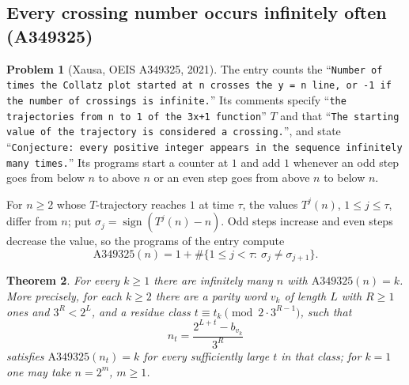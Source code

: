 \documentclass[11pt,a4paper]{article}
\newtheorem{theorem}{Theorem}[section]
\theoremstyle{definition}
\newtheorem{problem}[theorem]{Problem}
\theoremstyle{remark}
\numberwithin{equation}{section}
\begin{document}
\subsection{Every crossing number occurs infinitely often (A349325)}

\begin{problem}[Xausa, OEIS A349325, 2021]\label{B:P:prob:A349325}
The entry \cite{R042} counts the ``\texttt{Number of times the Collatz plot
started at n crosses the y = n line, or -1 if the number of crossings is
infinite.}'' Its comments specify ``\texttt{the trajectories from n to 1 of the
3x+1 function}'' $T$ and that ``\texttt{The starting value of the trajectory is
considered a crossing.}'', and state ``\texttt{Conjecture: every positive integer
appears in the sequence infinitely many times.}'' Its programs start a counter at
$1$ and add $1$ whenever an odd step goes from below $n$ to above $n$ or an
even step goes from above $n$ to below $n$.
\end{problem}

For $n\ge2$ whose $T$-trajectory reaches $1$ at time $\tau$, the values
$T^j(n)$, $1\le j\le\tau$, differ from $n$; put
$\sigma_j=\operatorname{sign}(T^j(n)-n)$. Odd steps increase and even steps
decrease the value, so the programs of the entry compute
\begin{equation}\label{B:P:eq:crossings}
\mathrm{A349325}(n)=1+\#\{1\le j<\tau:\ \sigma_j\ne\sigma_{j+1}\}.
\end{equation}

\begin{theorem}\label{B:P:thm:A349325}
For every $k\ge1$ there are infinitely many $n$ with $\mathrm{A349325}(n)=k$.
More precisely, for each $k\ge2$ there are a parity word $v_k$ of length $L$
with $R\ge1$ ones and $3^R<2^L$, and a residue class $t\equiv t_k\pmod{2\cdot3^{R-1}}$,
such that
\[
 n_t=\frac{2^{L+t}-b_{v_k}}{3^R}
\]
satisfies $\mathrm{A349325}(n_t)=k$ for every sufficiently large $t$ in that class;
for $k=1$ one may take $n=2^m$, $m\ge1$.
\end{theorem}
\end{document}
